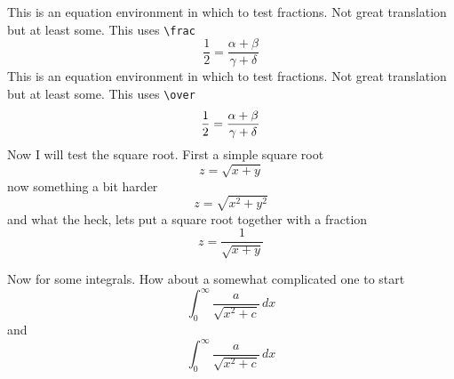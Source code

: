 \documentclass{article}
\begin{document}
This is an equation environment in which to test fractions.  Not great translation
but at least some.   This uses \verb#\frac#
$$
\frac{1}{2} = \frac{\alpha+\beta}{\gamma+\delta}
$$
This is an equation environment in which to test fractions.  Not great translation
but at least some.  This uses \verb#\over#
$$
{1 \over 2} = {\alpha+\beta \over \gamma+\delta}
$$
Now I will test the square root.  First a simple square root
$$
z = \sqrt{x+y}
$$
now something a bit harder
$$
z = \sqrt{x^2+y^2}
$$
and what the heck, lets put a square root together with a fraction
$$
z = \frac{1}{\sqrt{x+y}}
$$

Now for some integrals.  How about a somewhat complicated one to start
$$
\int_{0}^{\infty} \frac{a}{\sqrt{x^2+c}}\,dx
$$
and
$$
\int_0^\infty \frac{a}{\sqrt{x^2+c}}\,dx
$$
\end{document}
